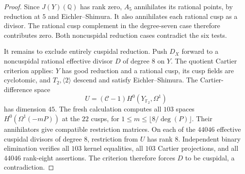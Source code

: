 \begin{proof}
Since $J(Y)(\mathbb Q)$ has rank zero, $A_5$ annihilates its rational
points, by reduction at $5$ and Eichler--Shimura. It also annihilates
each rational cusp as a divisor. The rational cusp complement in the
degree-seven case therefore contributes zero. Both noncuspidal
reduction cases contradict the six tests.

It remains to exclude entirely cuspidal reduction. Push $D_X$ forward
to a noncuspidal rational effective divisor $D$ of degree $8$ on $Y$.
The quotient Cartier criterion applies: $Y$ has good reduction and a
rational cusp, its cusp fields are cyclotomic, and $T_2,\langle2\rangle$
descend and satisfy Eichler--Shimura. The Cartier-difference space
\[
 U=(\mathcal C-1)H^0(Y_{\mathbb F_2},\Omega^1)
\]
has dimension $45$. The fresh calculation computes all $103$ spaces
$H^0(\Omega^1(-mP))$ at the $22$ cusps, for
$1\leq m\leq\lfloor8/\deg(P)\rfloor$. Their annihilators give
compatible restriction matrices. On each of the $44046$ effective
cuspidal divisors of degree $8$, restriction from $U$ has rank $8$.
Independent binary elimination verifies all $103$ kernel equalities,
all $103$ Cartier projections, and all $44046$ rank-eight assertions.
The criterion therefore forces $D$ to be cuspidal, a contradiction.
\end{proof}

